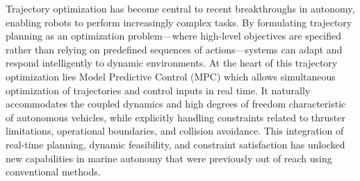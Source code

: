 
Trajectory optimization has become central to recent breakthroughs in autonomy, enabling robots to perform increasingly complex tasks. By formulating trajectory planning as an optimization problem—where high-level objectives are specified rather than relying on predefined sequences of actions—systems can adapt and respond intelligently to dynamic environments. At the heart of this trajectory optimization lies Model Predictive Control (MPC) which allows simultaneous optimization of trajectories and control inputs in real time. It naturally accommodates the coupled dynamics and high degrees of freedom characteristic of autonomous vehicles, while explicitly handling constraints related to thruster limitations, operational boundaries, and collision avoidance. This integration of real-time planning, dynamic feasibility, and constraint satisfaction has unlocked new capabilities in marine autonomy that were previously out of reach using conventional methods.




    

    
    

    
